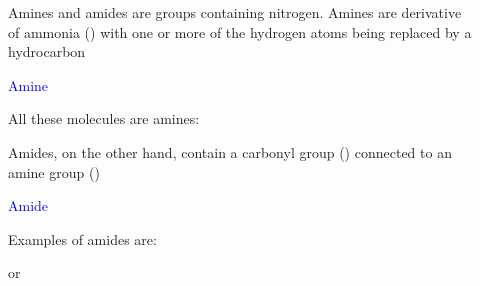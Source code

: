\documentclass[main.tex]{subfiles}
\begin{document}
\begin{description}










\item[] Amines and amides are groups containing nitrogen. Amines are derivative of ammonia () with one or more of the hydrogen atoms being replaced by a hydrocarbon
\begin{center}\hspace{0.5cm}\textcolor{blue}{Amine}\end{center}
 All these molecules are amines:
\begin{center}\hspace{1cm}   \hspace{1cm}   \end{center}
Amides, on the other hand, contain a carbonyl group () connected to an amine group ()
\begin{center}    \hspace{0.5cm}\textcolor{blue}{Amide}\end{center}
Examples of amides are:
\begin{center}\hspace{1cm} or \hspace{1cm}\end{center}


\end{description}
\end{document}
